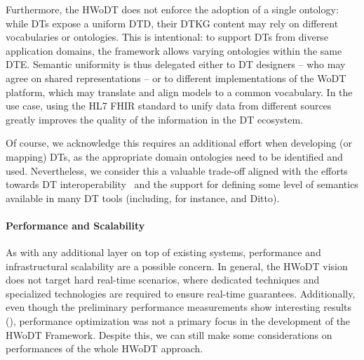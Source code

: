 Furthermore, the \ac{HWoDT} does not enforce the adoption of a single ontology: while \acp{DT} expose a uniform \ac{DTD}, their \ac{DTKG} content may rely on different vocabularies or ontologies.
This is intentional: to support \acp{DT} from diverse application domains, the framework allows varying ontologies within the same \ac{DTE}.  
Semantic uniformity is thus delegated either to \ac{DT} designers -- who may agree on shared representations -- or to different implementations of the \ac{WoDT} platform, which may translate and align models to a common vocabulary. 
%
In the use case, using the HL7 FHIR standard to unify data from different sources greatly improves the quality of the information in the \ac{DT} ecosystem.

Of course, we acknowledge this requires an additional effort when developing (or mapping) \acp{DT}, as the appropriate domain ontologies need to be identified and used.
Nevertheless, we consider this a valuable trade-off aligned with the efforts towards \ac{DT} interoperability~\cite{Klar_Arvidsson_Angelakis_2024} and the support for defining some level of semantics available in many \ac{DT} tools (including, for instance, \azureTwin{} and Ditto).



\paragraph{Performance and Scalability}

As with any additional layer on top of existing systems, performance and infrastructural scalability are a possible concern.
%
In general, the \ac{HWoDT} vision does not target hard real-time scenarios, where dedicated techniques and specialized technologies are required to ensure real-time guarantees.
%
Additionally, even though the preliminary performance measurements show interesting results (), performance optimization was not a primary focus in the development of the \ac{HWoDT} Framework. 
%
Despite this, we can still make some considerations on performances of the whole \ac{HWoDT} approach.

